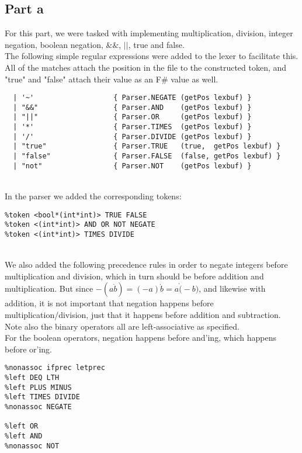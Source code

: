 \subsection*{Part a}

For this part, we were tasked with implementing multiplication, division, integer negation, boolean negation, $\&\&$, $||$, true and false. \\

The following simple regular expressions were added to the lexer to facilitate this. All of the matches attach the position in the file to the constructed token, and "true" and "false" attach their value as an F\# value as well.
\begin{verbatim}
  | '~'                   { Parser.NEGATE (getPos lexbuf) }
  | "&&"                  { Parser.AND    (getPos lexbuf) }
  | "||"                  { Parser.OR     (getPos lexbuf) }
  | '*'                   { Parser.TIMES  (getPos lexbuf) }
  | '/'                   { Parser.DIVIDE (getPos lexbuf) }
  | "true"                { Parser.TRUE   (true,  getPos lexbuf) }
  | "false"               { Parser.FALSE  (false, getPos lexbuf) }
  | "not"                 { Parser.NOT    (getPos lexbuf) }
\end{verbatim}
~\\

In the parser we added the corresponding tokens:
\begin{verbatim}
%token <bool*(int*int)> TRUE FALSE
%token <(int*int)> AND OR NOT NEGATE
%token <(int*int)> TIMES DIVIDE
\end{verbatim}
~\\

We also added the following precedence rules in order to negate integers before multiplication and division, which in turn should be before addition and multiplication. But since $-(a \dot b) = (-a) \dot b = a \dot (-b)$, and likewise with addition, it is not important that negation happens before multiplication/division, just that it happens before addition and subtraction. Note also the binary operators all are left-associative as specified. \\

For the boolean operators, negation happens before and'ing, which happens before or'ing.
\begin{verbatim}
%nonassoc ifprec letprec
%left DEQ LTH
%left PLUS MINUS
%left TIMES DIVIDE
%nonassoc NEGATE

%left OR
%left AND
%nonassoc NOT
\end{verbatim}


